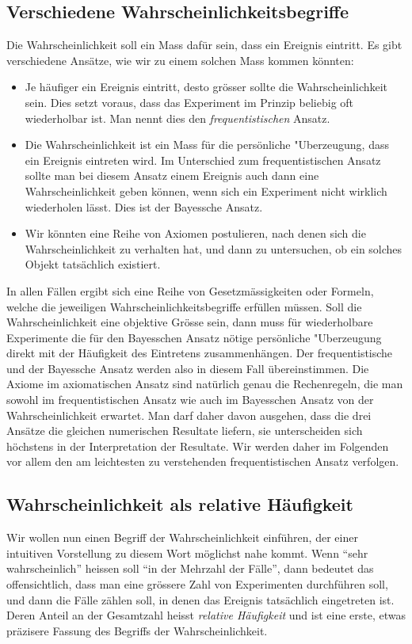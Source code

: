 \subsection{Verschiedene Wahrscheinlichkeitsbegriffe}
Die Wahrscheinlichkeit soll ein Mass dafür sein, dass ein Ereignis
eintritt.
Es gibt verschiedene Ansätze, wie wir zu einem solchen Mass kommen
könnten:
\begin{itemize}
\item 
Je häufiger ein Ereignis eintritt, desto grösser sollte die
Wahrscheinlichkeit sein.
Dies setzt voraus, dass das Experiment im Prinzip beliebig oft wiederholbar 
ist.
Man nennt dies den {\em frequentistischen} Ansatz.
\item
Die Wahrscheinlichkeit ist ein Mass für die persönliche
"Uberzeugung, dass ein Ereignis eintreten wird.
Im Unterschied zum frequentistischen Ansatz sollte man bei diesem
Ansatz einem Ereignis auch dann eine Wahrscheinlichkeit geben können,
wenn sich ein Experiment nicht wirklich wiederholen lässt.
Dies ist der Bayessche Ansatz.
\item
Wir könnten eine Reihe von Axiomen postulieren, nach denen sich
die Wahrscheinlichkeit zu verhalten hat, und dann zu untersuchen,
ob ein solches Objekt tatsächlich existiert.
\end{itemize}
In allen Fällen ergibt sich eine Reihe von Gesetzmässigkeiten
oder Formeln, welche die jeweiligen Wahrscheinlichkeitsbegriffe 
erfüllen müssen.
Soll die Wahrscheinlichkeit eine objektive Grösse sein, dann
muss für wiederholbare Experimente die für den Bayesschen
Ansatz nötige persönliche "Uberzeugung direkt mit der Häufigkeit
des Eintretens zusammenhängen.
Der frequentistische und der Bayessche Ansatz werden also in diesem
Fall übereinstimmen.
Die Axiome im axiomatischen Ansatz sind natürlich genau die
Rechenregeln, die man sowohl im frequentistischen Ansatz wie
auch im Bayesschen Ansatz von der Wahrscheinlichkeit erwartet.
Man darf daher davon ausgehen, dass die drei Ansätze die gleichen numerischen
Resultate liefern, sie unterscheiden sich höchstens in der Interpretation
der Resultate.
Wir werden daher im Folgenden vor allem den am leichtesten zu
verstehenden frequentistischen Ansatz verfolgen.

\subsection{Wahrscheinlichkeit als relative Häufigkeit}
Wir wollen nun einen Begriff der Wahrscheinlichkeit einführen, der
einer intuitiven Vorstellung zu diesem Wort möglichst nahe kommt.
Wenn ``sehr
wahrscheinlich'' heissen soll ``in der Mehrzahl der Fälle'', dann
bedeutet das offensichtlich, dass man eine grössere Zahl von
Experimenten durchführen soll, und dann die Fälle zählen soll,
in denen das Ereignis tatsächlich eingetreten ist.
Deren Anteil
an der Gesamtzahl heisst {\em relative Häufigkeit} und ist eine erste,
etwas präzisere Fassung des Begriffs der Wahrscheinlichkeit.

